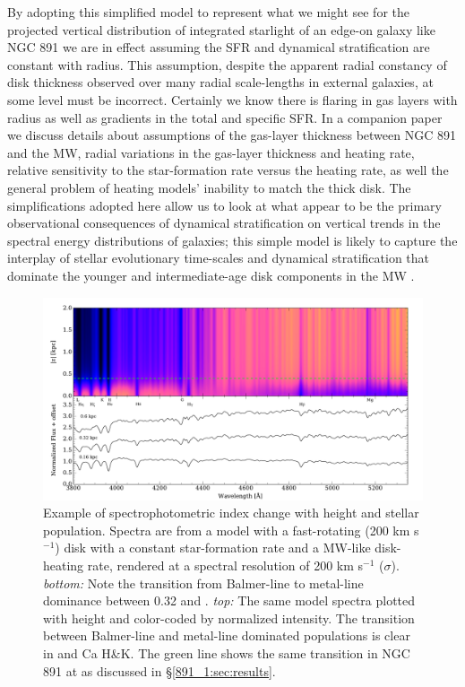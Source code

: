 By adopting this simplified model to represent what we might see for
the projected vertical distribution of integrated starlight of an
edge-on galaxy like NGC 891 we are in effect assuming the SFR and
dynamical stratification are constant with radius. This assumption,
despite the apparent radial constancy of disk thickness observed over
many radial scale-lengths in external galaxies, at some level must be
incorrect. Certainly we know there is flaring in gas layers with
radius as well as gradients in the total and specific SFR.  In a
companion paper we discuss details about assumptions of the gas-layer
thickness between NGC 891 and the MW, radial variations in the
gas-layer thickness and heating rate, relative sensitivity to the
star-formation rate versus the heating rate, as well the general
problem of heating models' inability to match the thick disk. The
simplifications adopted here allow us to look at what appear to be the
primary observational consequences of dynamical stratification on
vertical trends in the spectral energy distributions of galaxies; this
simple model is likely to capture the interplay of stellar
evolutionary time-scales and dynamical stratification that dominate
the younger and intermediate-age disk components in the MW
\citep{Bird13}.

\begin{figure}
  \centering
  \includegraphics[width=\textwidth]{891_1/figs/mab_stack.pdf}
  \caption[Heating signature in Milky Way
  model]{\label{891_1:fig:MW_heating}\fixspacing Example of
    spectrophotometric index change with height and stellar
    population. Spectra are from a model with a fast-rotating (200 km
    s$^{-1}$) disk with a constant star-formation rate and a MW-like
    disk-heating rate, rendered at a spectral resolution of 200 km
    s$^{-1}$ ($\sigma$).  \emph{bottom:} Note the transition from
    Balmer-line to metal-line dominance between 0.32 and
    . \emph{top:} The same model spectra plotted with
    height and color-coded by normalized intensity. The transition
    between Balmer-line and metal-line dominated populations is clear
    in \Hda and Ca H\&K. 
The green line shows the same transition in NGC 891 at
     as discussed in \S\ref{891_1:sec:results}.}
\end{figure}

